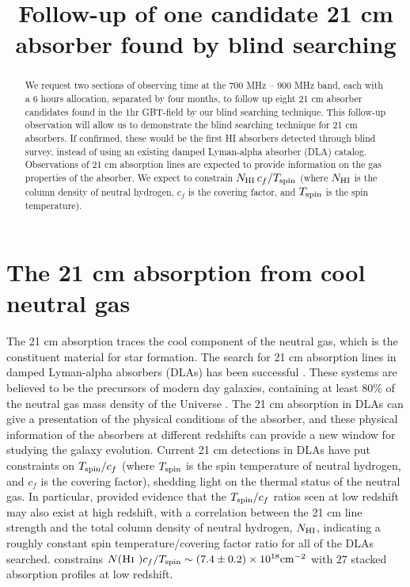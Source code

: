 \documentclass[prl,twocolumn,floatfix,superscriptaddress,nofootinbib,aps]{revtex4}
\def\hi{\textsc{Hi~}}
\begin{document}
\title{Follow-up of one candidate 21 cm absorber found by blind searching}




\begin{abstract}
We request two sections of observing time at the 700 MHz -- 900 MHz band,
each with a 6 hours allocation, separated by four months, 
to follow up eight 21 cm absorber candidates found in the 1hr GBT-field by our blind searching technique. 
This follow-up observation will allow us to demonstrate the blind searching technique for 21 cm absorbers. 
If confirmed, these would be the first HI absorbers detected through blind survey, instead of using 
an existing damped Lyman-alpha absorber (DLA) catalog. Observations of 21 cm absorption lines are expected 
to provide information on the gas properties of the absorber. We expect to constrain 
$N_{\rm HI}\,c_f/T_{\rm spin}$ (where $N_{\rm HI}$ is the column density of neutral hydrogen, 
$c_f$ is the covering factor, and $T_{\rm spin}$ is the spin temperature).
\end{abstract}

\maketitle

\section{The 21 cm absorption from cool neutral gas}
The 21 cm absorption traces the cool component of the neutral gas, 
which is the constituent material 
for star formation. The search for 21 cm absorption lines in damped 
Lyman-alpha absorbers (DLAs) has been successful 
\cite{2006MNRAS.370L..46K,2007MNRAS.375.1528K,2007MNRAS.382L..53Y,
2010MNRAS.402...35C,2014A&A...569A..35G,2011ApJ...727...52B,2015A&A...575A..44G}. 
These systems are believed to be the precursors of modern day galaxies, 
containing at least 80\% of the neutral gas mass density of the Universe
\cite{2005ApJ...635..123P}. The 21 cm absorption in DLAs can give a presentation of the physical conditions of the absorber, and these physical information of the absorbers at different redshifts can provide a new window for studying the galaxy evolution.  
Current 21 cm detections in DLAs have put constraints on $T_{\rm spin} /c_f$ 
(where $T_{\rm spin}$ is the spin temperature of neutral hydrogen, and 
$c_f$ is the covering factor), shedding light on the thermal status of 
the neutral gas. In particular, \citet{2010MNRAS.402...35C} provided evidence that the 
$T_{\rm spin}/c_f$ ratios seen at low redshift may also exist at high redshift, 
with a correlation between the 21 cm line strength and the total column density
of neutral hydrogen, $N_{\rm HI}$, indicating a roughly constant spin 
temperature/covering factor ratio for all of the DLAs searched.
\citet{2014A&A...569A..35G} constrains 
$N(\hi)c_f/T_{\rm spin}\sim(7.4\pm0.2)\times10^{18}\rm cm^{-2}$ with 
$27$ stacked absorption profiles at low redshift.
\end{document}
